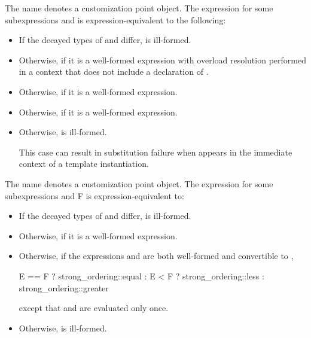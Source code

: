 %
\pnum
The name  denotes
a customization point object.
The expression 
for some subexpressions  and 
is expression-equivalent to the following:
\begin{itemize}
\item
  If the decayed types of  and  differ,
   is ill-formed.
\item
  Otherwise, 
  if it is a well-formed expression
  with overload resolution performed in a context
  that does not include a declaration of .
\item
  Otherwise, 
  if it is a well-formed expression.
\item
  Otherwise, 
  if it is a well-formed expression.
\item
  Otherwise,  is ill-formed.
  \begin{note}
  This case can result in substitution failure
  when 
  appears in the immediate context of a template instantiation.
\end{note}
\end{itemize}

%
\pnum
The name 
denotes a customization point object.
The expression 
for some subexpressions  and {F}
is expression-equivalent to:
\begin{itemize}
\item
  If the decayed types of  and  differ,
   is ill-formed.
\item
  Otherwise,  if it is a well-formed expression.
\item
  Otherwise, if the expressions  and 
  are both well-formed and convertible to ,
\begin{codeblock}
E == F ? strong_ordering::equal :
E < F  ? strong_ordering::less :
         strong_ordering::greater
\end{codeblock}
except that  and  are evaluated only once.
\item
Otherwise,  is ill-formed.
\end{itemize}

